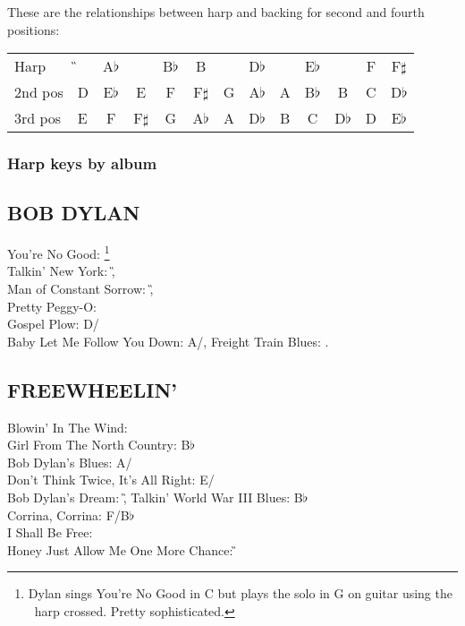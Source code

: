 \begin{articlelayout}
These are the relationships between harp and backing for second and
fourth positions:

\begin{center}\begin{tabular}{llccccccccccc}
Harp & \G & A$\flat$ & \A & B$\flat$ & B & \C & D$\flat$ & \D & E$\flat$ & \E & F& F$\sharp$\tabularnewline
2nd pos & D & E$\flat$ & E & F & F$\sharp$ & G & A$\flat$ & A & B$\flat$ & B & C & D$\flat$\tabularnewline
3rd pos & E & F & F$\sharp$ & G & A$\flat$ & A & D$\flat$ & B & C & D$\flat$ & D & E$\flat$\tabularnewline
\end{tabular}\end{center}

\subsubsection*{Harp keys by album}

\subsection{BOB DYLAN}
You're No Good: \C\footnote{Dylan sings You're No Good in C but plays the solo in G on guitar using the \C~harp crossed. Pretty sophisticated.} \\
Talkin' New York: \G,\\
Man of Constant Sorrow: \G,\\
Pretty Peggy-O: \G\\ Gospel Plow: D/\G\\ Baby Let Me Follow You Down: A/\D,
Freight Train Blues: \C.


\subsection{FREEWHEELIN'}
Blowin' In The Wind: \D\\
Girl From The North Country: B$\flat$\\
Bob Dylan's Blues: A/\D\\
Don't Think Twice, It's All Right: E/\A\\
Bob Dylan's Dream: \G,
 Talkin' World War III Blues: B$\flat$\\
 Corrina, Corrina: F/B$\flat$\\
 I Shall Be Free: \G\\
 Honey Just Allow Me One More Chance: \G



\end{articlelayout}
